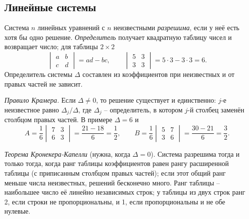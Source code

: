 \documentclass[12pt,a4paper]{article}
\begin{document}
\subsection{Линейные системы}

Система $n$ линейных уравнений с $n$ неизвестными \emph{разрешима}, если у неё
есть хотя бы одно решение. \emph{Определитель} получает квадратную таблицу
чисел и возвращает число; для таблицы $2 \times 2$
\[
  \begin{vmatrix} a & b\\ c & d \end{vmatrix} = ad - bc,
  \qquad
  \begin{vmatrix} 5 & 3\\ 3 & 3 \end{vmatrix} = 5 \cdot 3 - 3 \cdot 3 = 6 .
\]
Определитель системы $\Delta$ составлен из коэффициентов при неизвестных и от
правых частей не зависит.

\emph{Правило Крамера.} Если $\Delta \ne 0$, то решение существует и
единственно: $j$-е неизвестное равно $\Delta_j/\Delta$, где $\Delta_j$ --
определитель, в котором $j$-й столбец заменён столбцом правых частей. В примере
$\Delta = 6$ и
\[
  A = \frac16\begin{vmatrix} 7 & 3\\ 6 & 3 \end{vmatrix} = \frac{21 - 18}{6}
    = \frac12,
  \qquad
  B = \frac16\begin{vmatrix} 5 & 7\\ 3 & 6 \end{vmatrix} = \frac{30 - 21}{6}
    = \frac32 .
\]

\emph{Теорема Кронекера-Капелли} (нужна, когда $\Delta = 0$). Система
разрешима тогда и только тогда, когда ранг таблицы коэффициентов равен рангу
расширенной таблицы (с приписанным столбцом правых частей); если этот общий
ранг меньше числа неизвестных, решений бесконечно много. Ранг таблицы --
наибольшее число её линейно независимых строк; у таблицы из двух строк ранг 2,
если строки не пропорциональны, и 1, если пропорциональны и не обе нулевые.
\end{document}
